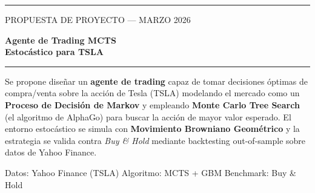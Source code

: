 \documentclass[11pt, a4paper]{article}
\newcommand{\highlight}[2][acc1]{\textcolor{#1}{\textbf{#2}}}
\begin{document}
\begin{titlepage}
  \centering
  \vspace*{1.5cm}

  {\color{acc1}\rule{\linewidth}{1.5pt}}
  \vspace{0.4cm}

  {\footnotesize\color{mut}\MakeUppercase{Propuesta de Proyecto — Marzo 2026}}
  \vspace{0.8cm}

  {\Huge\bfseries\color{txt}
    Agente de Trading MCTS\\[0.3em]
    Estocástico para TSLA}

  \vspace{0.5cm}
  {\color{acc1}\rule{\linewidth}{1.5pt}}
  \vspace{1.2cm}


  \vspace{1.4cm}

  \begin{tcolorbox}[darkcard=acc1, width=0.88\linewidth,
    title={Resumen ejecutivo}]
    Se propone diseñar un \highlight{agente de trading} capaz de tomar
    decisiones óptimas de compra/venta sobre la acción de Tesla (TSLA)
    modelando el mercado como un \highlight{Proceso de Decisión de Markov}
    y empleando \highlight{Monte Carlo Tree Search} (el algoritmo de
    AlphaGo) para buscar la acción de mayor valor esperado.
    El entorno estocástico se simula con \highlight{Movimiento Browniano
    Geométrico} y la estrategia se valida contra \emph{Buy \& Hold}
    mediante backtesting out-of-sample sobre datos de Yahoo Finance.
  \end{tcolorbox}

  \vfill
  {\small\color{mut}
    \faDatabase\; Datos: Yahoo Finance (TSLA)\quad
    \faCode\; Algoritmo: MCTS + GBM\quad
    \faChartLine\; Benchmark: Buy \& Hold}
\end{titlepage}
\end{document}
